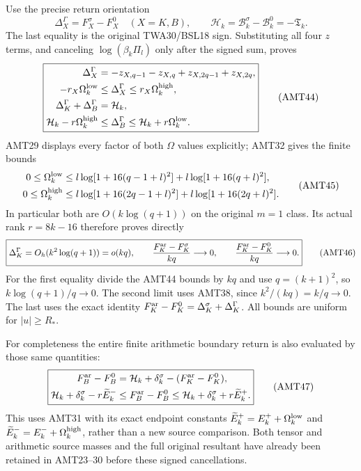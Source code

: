 \documentclass[11pt,a4paper]{article}
\begin{document}
Use the precise return orientation
\[
 \Delta_X^\Gamma=F_X^\sigma-F_X^0\quad(X=K,B),\qquad
 \mathcal H_k=\mathcal B_k^\sigma-\mathcal B_k^0=-\mathfrak T_k.
\]
The last equality is the original TWA30/BSL18 sign. Substituting
all four $z$ terms, and canceling $\log(\beta_k\Pi_l)$ only
after the signed sum, proves
\[
\boxed{\begin{split}
 \Delta_X^\Gamma
   &=-z_{X,q-1}-z_{X,q}+z_{X,2q-1}+z_{X,2q},\\
 -r_X\Omega_k^{\rm low}
   &\le\Delta_X^\Gamma\le r_X\Omega_k^{\rm high},\\
 \Delta_K^\Gamma+\Delta_B^\Gamma&=\mathcal H_k,\\
 \mathcal H_k-r\Omega_k^{\rm high}
   &\le\Delta_B^\Gamma\le\mathcal H_k+r\Omega_k^{\rm low}.
\end{split}}\tag{AMT44}
\]
AMT29 displays every factor of both $\Omega$ values explicitly;
AMT32 gives the finite bounds
\[
\begin{split}
 0\le\Omega_k^{\rm low}
 &\le l\log[1+16(q-1+l)^2]+l\log[1+16(q+l)^2],\\
 0\le\Omega_k^{\rm high}
 &\le l\log[1+16(2q-1+l)^2]+l\log[1+16(2q+l)^2].
\end{split}\tag{AMT45}
\]
In particular both are $O(k\log(q+1))$ on the original
$m=1$ class. Its actual rank $r=8k-16$ therefore proves directly
\[
 \boxed{\Delta_K^\Gamma=O_h(k^2\log(q+1))=o(kq),\qquad
 \frac{F_K^{\rm ar}-F_K^\sigma}{kq}\longrightarrow0,\qquad
 \frac{F_K^{\rm ar}-F_K^0}{kq}\longrightarrow0.}
 \tag{AMT46}
\]
For the first equality divide the AMT44 bounds by $kq$ and use
$q=(k+1)^2$, so $k\log(q+1)/q\to0$. The second limit uses
AMT38, since $k^2/(kq)=k/q\to0$. The last uses the exact
identity $F_K^{\rm ar}-F_K^0=\Delta_K^\sigma+\Delta_K^\Gamma$.
All bounds are uniform for $|u|\ge R_*$.

For completeness the entire finite arithmetic boundary return is
also evaluated by those same quantities:
\[
\boxed{\begin{split}
 F_B^{\rm ar}-F_B^0
   &=\mathcal H_k+\delta_k^\sigma
                         -(F_K^{\rm ar}-F_K^0),\\
 \mathcal H_k+\delta_k^\sigma-r\widetilde E_k^-
   &\le F_B^{\rm ar}-F_B^0
             \le\mathcal H_k+\delta_k^\sigma+r\widetilde E_k^+.
\end{split}}\tag{AMT47}
\]
This uses AMT31 with its exact endpoint constants
$\widetilde E_k^+=E_k^++\Omega_k^{\rm low}$ and
$\widetilde E_k^-=E_k^-+\Omega_k^{\rm high}$, rather than a
new source comparison. Both tensor and arithmetic source masses
and the full original resultant have already been retained in
AMT23--30 before these signed cancellations.
\end{document}
